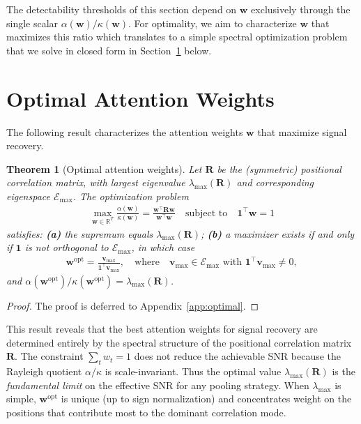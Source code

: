 \documentclass{article}
\def\vone{{\bm{1}}}
\def\vv{{\bm{v}}}
\def\vw{{\bm{w}}}
\def\mR{{\bm{R}}}
\def\gE{{\mathcal{E}}}
\def\sR{{\mathbb{R}}}
\newtheorem{theorem}{Theorem}
\newcommand{\opt}{\mathrm{opt}}
\begin{document}
\vspace{0.25em}
The detectability thresholds of this section depend on $\vw$ exclusively through the single scalar $\alpha(\vw)/\kappa(\vw)$. For optimality, we aim to characterize $\vw$ that maximizes this ratio which translates to a simple spectral optimization problem that we solve in closed form in Section~\ref{sec:optimal} below.


\section{Optimal Attention Weights}\label{sec:optimal}

The following result characterizes the attention weights $\vw$ that maximize signal recovery.

\begin{theorem}[Optimal attention weights]\label{thm:optimal}
Let $\mR$ be the (symmetric) positional correlation matrix, with largest eigenvalue $\lambda_{\mathrm{max}}(\mR)$ and corresponding eigenspace $\gE_{\mathrm{max}}$. The optimization problem
\begin{align}\label{eq:opt_problem}
    \max_{\vw\in\sR^T} \frac{\alpha(\vw)}{\kappa(\vw)} = \frac{\vw^\top \mR \vw}{\vw^\top \vw} \quad \text{subject to} \quad \vone^\top \vw = 1
\end{align}
satisfies: \textbf{(a)} the supremum equals $\lambda_{\mathrm{max}}(\mR)$; \textbf{(b)} a maximizer exists if and only if $\vone$ is not orthogonal to $\gE_{\mathrm{max}}$, in which case
\begin{align}\label{eq:w_opt}
    \vw^\opt = \frac{\vv_{\mathrm{max}}}{\vone^\top \vv_{\mathrm{max}}}, \quad \text{where} \quad \vv_{\mathrm{max}} \in \gE_{\mathrm{max}} \text{ with } \vone^\top \vv_{\mathrm{max}} \neq 0,
\end{align}
and $\alpha(\vw^\opt)/\kappa(\vw^\opt) = \lambda_{\mathrm{max}}(\mR)$.
\end{theorem}
\begin{proof}
The proof is deferred to Appendix~\ref{app:optimal}.
\end{proof}

This result reveals that the best attention weights for signal recovery are determined entirely by the spectral structure of the positional correlation matrix $\mR$. The constraint $\sum_t w_t = 1$ does not reduce the achievable SNR because the Rayleigh quotient $\alpha/\kappa$ is scale-invariant. Thus the optimal value $\lambda_{\mathrm{max}}(\mR)$ is the \emph{fundamental limit} on the effective SNR for any pooling strategy. When $\lambda_{\mathrm{max}}$ is simple, $\vw^\opt$ is unique (up to sign normalization) and concentrates weight on the positions that contribute most to the dominant correlation mode.
\end{document}
